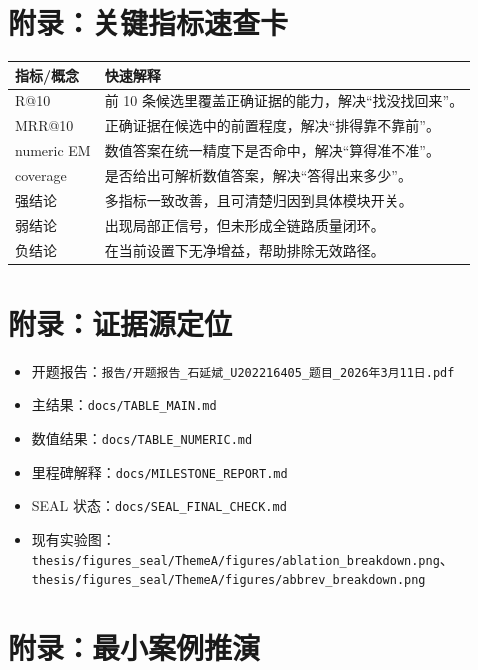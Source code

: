 \documentclass[UTF8,a4paper,12pt]{ctexart}
\begin{document}
\appendix
\section{附录：关键指标速查卡}
\begin{longtable}{>{\raggedright\arraybackslash}p{2.6cm} >{\raggedright\arraybackslash}p{10.7cm}}
\toprule
指标/概念 & 快速解释 \\
\midrule
\endhead
R@10 & 前 10 条候选里覆盖正确证据的能力，解决“找没找回来”。 \\
MRR@10 & 正确证据在候选中的前置程度，解决“排得靠不靠前”。 \\
numeric EM & 数值答案在统一精度下是否命中，解决“算得准不准”。 \\
coverage & 是否给出可解析数值答案，解决“答得出来多少”。 \\
强结论 & 多指标一致改善，且可清楚归因到具体模块开关。 \\
弱结论 & 出现局部正信号，但未形成全链路质量闭环。 \\
负结论 & 在当前设置下无净增益，帮助排除无效路径。 \\
\bottomrule
\end{longtable}

\section{附录：证据源定位}
\begin{itemize}
  \item 开题报告：\texttt{报告/开题报告\_石延斌\_U202216405\_题目\_2026年3月11日.pdf}
  \item 主结果：\texttt{docs/TABLE\_MAIN.md}
  \item 数值结果：\texttt{docs/TABLE\_NUMERIC.md}
  \item 里程碑解释：\texttt{docs/MILESTONE\_REPORT.md}
  \item SEAL 状态：\texttt{docs/SEAL\_FINAL\_CHECK.md}
  \item 现有实验图：\texttt{thesis/figures\_seal/ThemeA/figures/ablation\_breakdown.png}、
  \texttt{thesis/figures\_seal/ThemeA/figures/abbrev\_breakdown.png}
\end{itemize}

\section{附录：最小案例推演}
\end{document}
